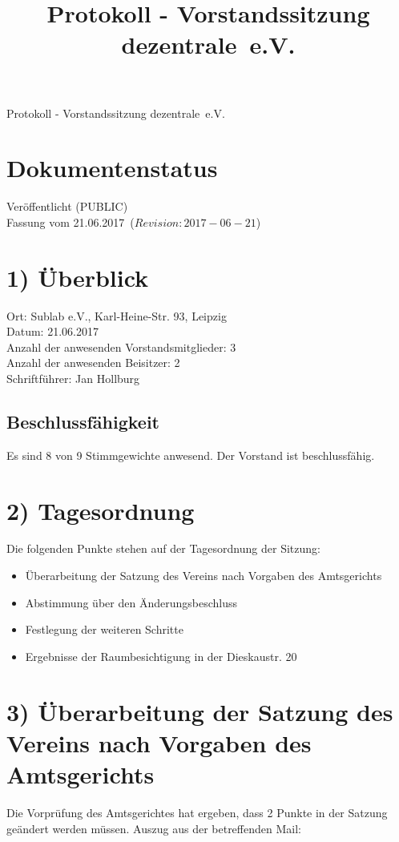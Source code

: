 \documentclass[10pt,a4paper]{scrartcl}
\newcommand{\qs}[1]{\glqq#1\grqq}
\newcommand{\name}{dezentrale}
\newcommand{\revision}{$Revision: 2017-06-21$}
\newcommand{\eventdate}{21.06.2017}
\newcommand{\schriftfuehrer}{Jan Hollburg}
\newcommand{\documentstatus}{Ver{\"o}ffentlicht (PUBLIC)}
\begin{document}
\title{Protokoll - Vorstandssitzung \qs{\name\ e.V.}}
{\LARGE Protokoll - Vorstandssitzung \qs{\name\ e.V.}}

\section*{Dokumentenstatus}
\documentstatus\\
Fassung vom \eventdate\ (\revision)

\section*{1) {\"U}berblick}
    Ort: Sublab e.V., Karl-Heine-Str. 93, Leipzig\\
    Datum: \eventdate\\
	Anzahl der anwesenden Vorstandsmitglieder: 3\\
	Anzahl der anwesenden Beisitzer: 2\\
    Schriftf{\"u}hrer: \schriftfuehrer
\subsection*{Beschlussf{\"a}higkeit}
    Es sind 8 von 9 Stimmgewichte anwesend. Der Vorstand ist beschlussf{\"a}hig.

\section*{2) Tagesordnung}
    Die folgenden Punkte stehen auf der Tagesordnung der Sitzung:
	\begin{itemize}
        \item {\"U}berarbeitung der Satzung des Vereins nach Vorgaben des Amtsgerichts
		\item Abstimmung {\"u}ber den {\"A}nderungsbeschluss
		\item Festlegung der weiteren Schritte
		\item Ergebnisse der Raumbesichtigung in der Dieskaustr. 20
    \end{itemize}

\section*{3) {\"U}berarbeitung der Satzung des Vereins nach Vorgaben des Amtsgerichts}
	Die Vorpr{\"u}fung des Amtsgerichtes hat ergeben, dass 2 Punkte in der
	Satzung geändert werden m{\"u}ssen. Auszug aus der betreffenden Mail:
\end{document}
